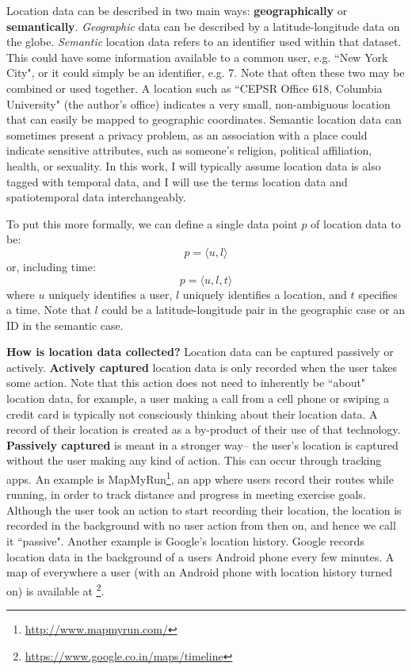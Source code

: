 \documentclass[12pt]{article}
\begin{document}
Location data can be described in two main ways: \textbf{geographically} or \textbf{semantically}.
\emph{Geographic} data can be described by a latitude-longitude data on the globe.
\emph{Semantic} location data refers to an identifier used within that dataset.
This could have some information available to a common user, e.g. ``New York City", or it could simply be an identifier, e.g. 7.
Note that often these two may be combined or used together.
A location such as ``CEPSR Office 618, Columbia University" (the author's office) indicates a very small, non-ambiguous location that can easily be mapped to geographic coordinates.
Semantic location data can sometimes present a privacy problem, as an association with a place could indicate sensitive attributes, such as someone's religion, political affiliation, health, or sexuality.
In this work, I will typically assume location data is also tagged with temporal data, and I will use the terms location data and spatiotemporal data interchangeably.

To put this more formally, we can define a single data point $p$ of location data to be:
\[ p = \langle u, l \rangle \]
or, including time:
\[ p = \langle u, l, t \rangle \]
where $u$ uniquely identifies a user, $l$ uniquely identifies a location, and $t$ specifies a time.
Note that $l$ could be a latitude-longitude pair in the geographic case or an ID in the semantic case.

\textbf{How is location data collected?}
Location data can be captured passively or actively.
\textbf{Actively captured} location data is only recorded when the user takes some action.
Note that this action does not need to inherently be ``about" location data, for example, a user making a call from a cell phone or swiping a credit card is typically not consciously thinking about their location data. 
A record of their location is created as a by-product of their use of that technology.
\textbf{Passively captured} is meant in a stronger way-- the user's location is captured without the user making any kind of action.
This can occur through tracking apps.
An example is MapMyRun\footnote{\url{http://www.mapmyrun.com/}}, an app where users record their routes while running, in order to track distance and progress in meeting exercise goals.
Although the user took an action to start recording their location, the location is recorded in the background with no user action from then on, and hence we call it ``passive".
Another example is Google's location history.
Google records location data in the background of a users Android phone every few minutes.
A map of everywhere a user (with an Android phone with location history turned on) is available at \footnote{\url{https://www.google.co.in/maps/timeline}}.
\end{document}
